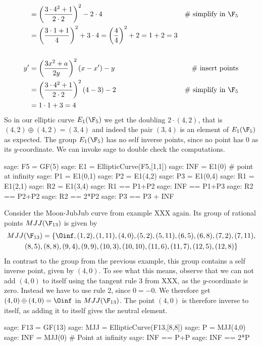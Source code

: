 \begin{example}
\begin{align*}
    & = \left(\frac{3\cdot 4^2+1}{2\cdot 2}\right)^2 -2\cdot 4 & \text{\# simplify in } \F_5 \\
    & = \left(\frac{3\cdot 1+1}{4}\right)^2 +3\cdot 4
      = \left(\frac{4}{4}\right)^2 +2
      = 1 +2 
      = 3
\\
\\
y'  & = \left(\frac{3x^2+a}{2y}\right)^2\left(x-x'\right) - y  & \text{\# insert points} \\
    & = \left(\frac{3\cdot 4^2+1}{2\cdot 2}\right)^2\left(4-3\right) - 2 & \text{\# simplify in } \F_5\\
    & = 1\cdot 1 + 3
      = 4
\end{align*}
So in our elliptic curve $E_1(\F_5)$ we get the doubling $2\cdot (4,2)$, that is $(4,2)\oplus (4,2) =(3,4)$ and indeed the pair $(3,4)$ is an element of $E_1(\F_5)$ as expected. The group $E_1(\F_5)$ has no self inverse points, since no point has $0$ as its $y$-coordinate. We can invoke sage to double check the computations. 
\begin{sagecommandline}
sage: F5 = GF(5)
sage: E1 = EllipticCurve(F5,[1,1])
sage: INF = E1(0) # point at infinity
sage: P1 = E1(0,1)
sage: P2 = E1(4,2)
sage: P3 = E1(0,4)
sage: R1 = E1(2,1)
sage: R2 = E1(3,4)
sage: R1 == P1+P2
sage: INF == P1+P3
sage: R2 == P2+P2
sage: R2 == 2*P2
sage: P3 == P3 + INF
\end{sagecommandline}
\end{example}
\begin{example} Consider the Moon-JubJub curve from example XXX again. Its group of rational points $MJJ(\F_{13})$ is given by 
\begin{multline*}
MJJ(\F_{13}) = \{\Oinf, (1, 2), (1, 11), (4, 0), (5, 2), (5, 11), (6, 5), (6, 8), (7,2), (7, 11), \\ (8, 5), (8, 8), (9, 4), (9, 9), (10, 3), (10,
10), (11, 6), (11, 7), (12, 5), (12, 8)\}
\end{multline*}
In contrast to the group from the previous example, this group contains a self inverse point, given by $(4,0)$. To see what this means, observe that we can not add $(4,0)$ to itself using the tangent rule 3 from XXX, as the $y$-coordinate is zero. Instead we have to use rule 2, since $0=-0$. We therefore get $(4,0)\oplus (4,0)=\Oinf$ in $MJJ(\F_{13})$. The point $(4,0)$ is therefore inverse to itself, as adding it to itself gives the neutral element. 
\begin{sagecommandline}
sage: F13 = GF(13)
sage: MJJ = EllipticCurve(F13,[8,8])
sage: P = MJJ(4,0)
sage: INF = MJJ(0) # Point at infinity
sage: INF == P+P
sage: INF == 2*P
\end{sagecommandline}
\end{example}
